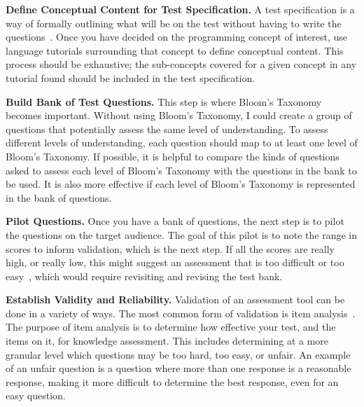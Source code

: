 \documentclass{llncs}
\begin{document}
\vspace{0.5em}
\noindent\textbf{Define Conceptual Content for Test Specification.} A test specification is a way of formally outlining what will be on the test without having to write the questions~\cite{tew2010developing}. Once you have decided on the programming concept of interest, use language tutorials surrounding that concept to define conceptual content. This process should be exhaustive; the sub-concepts covered for a given concept in any tutorial found should be included in the test specification.

\vspace{0.5em}

\noindent\textbf{Build Bank of Test Questions.} This step is where Bloom's Taxonomy becomes important. Without using Bloom's Taxonomy, I could create a group of questions that potentially assess the same level of understanding. To assess different levels of understanding, each question should map to at least one level of Bloom's Taxonomy. If possible, it is helpful to compare the kinds of questions asked to assess each level of Bloom's Taxonomy with the questions in the bank to be used.
It is also more effective if each level of Bloom's Taxonomy is represented in the bank of questions.

\vspace*{0.5em}

\noindent\textbf{Pilot Questions.} Once you have a bank of questions, the next step is to pilot the questions on the target audience. The goal of this pilot is to note the range in scores to inform validation, which is the next step. If all the scores are really high, or really low, this might suggest an assessment that is too difficult or too easy~\cite{nelson1967testing}, which would require revisiting and revising the test bank.

\vspace*{0.5em}

\noindent \textbf{Establish Validity and Reliability.} Validation of an assessment tool can be done in a variety of ways. The most common form of validation is item analysis~\cite{gorsuch1997exploratory}. The purpose of item analysis is to determine how effective your test, and the items on it, for knowledge assessment. This includes determining at a more granular level which questions may be too hard, too easy, or unfair. 
An example of an unfair question is a question where more than one response is a reasonable response, making it more difficult to determine the best response, even for an easy question.
\end{document}
